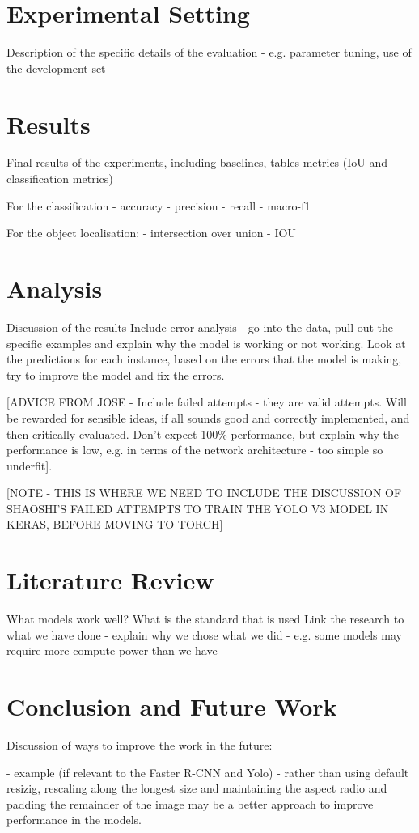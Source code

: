 \documentclass{article}
\begin{document}
\section{Experimental Setting}

Description of the specific details of the evaluation - e.g. parameter tuning, use of the development set


\section{Results}

Final results of the experiments, including baselines, tables metrics (IoU and classification metrics)

For the classification
- accuracy
- precision
- recall
- macro-f1

For the object localisation:
- intersection over union - IOU

\section{Analysis}

Discussion of the results
Include error analysis - go into the data, pull out the specific examples and explain why the model is working or not working. Look at the predictions for each instance, based on the errors that the model is making, try to improve the model and fix the errors.

[ADVICE FROM JOSE - Include failed attempts - they are valid attempts. Will be rewarded for sensible ideas, if all sounds good and correctly implemented, and then critically evaluated. Don't expect 100\% performance, but explain why the performance is low, e.g. in terms of the network architecture - too simple so underfit].

[NOTE - THIS IS WHERE WE NEED TO INCLUDE THE DISCUSSION OF SHAOSHI'S FAILED ATTEMPTS TO TRAIN THE YOLO V3 MODEL IN KERAS, BEFORE MOVING TO TORCH]


\section{Literature Review}

What models work well?
What is the standard that is used
Link the research to what we have done - explain why we chose what we did - e.g.
some models may require more compute power than we have


\section{Conclusion and Future Work}

Discussion of ways to improve the work in the future:

- example (if relevant to the Faster R-CNN and Yolo) - rather than using default resizig, rescaling along the longest size and maintaining the aspect radio and padding the remainder of the image may be a better approach to improve performance in the models.
\end{document}
